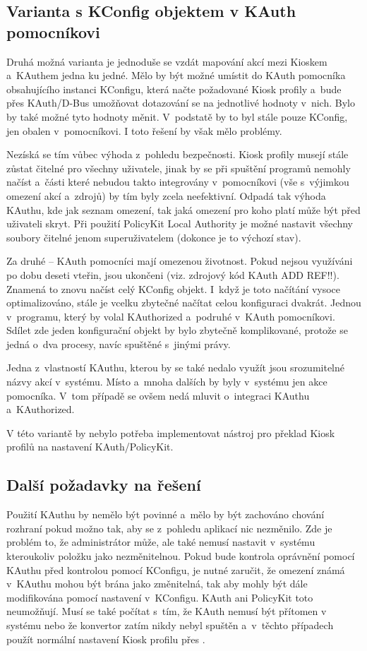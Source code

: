\subsection*{Varianta s KConfig objektem v KAuth pomocníkovi}
Druhá možná varianta je jednoduše se vzdát mapování akcí mezi Kioskem a~KAuthem jedna ku jedné. Mělo by být možné umístit do KAuth pomocníka obsahujícího instanci KConfigu, která načte požadované Kiosk profily a~bude přes KAuth/D-Bus umožňovat dotazování se na jednotlivé hodnoty v~nich. Bylo by také možné tyto hodnoty měnit. V~podstatě by to byl stále pouze KConfig, jen obalen v~pomocníkovi. I toto řešení by však mělo problémy.

Nezíská se tím vůbec výhoda z~pohledu bezpečnosti. Kiosk profily musejí stále zůstat čitelné pro všechny uživatele, jinak by se při spuštění programů nemohly načíst a~části které nebudou takto integrovány v~pomocníkovi (vše s~výjimkou omezení akcí a~zdrojů) by tím byly zcela neefektivní. Odpadá tak výhoda KAuthu, kde jak seznam omezení, tak jaká omezení pro koho platí může být před uživateli skryt. Při použití PolicyKit Local Authority je možné nastavit všechny soubory čitelné jenom superuživatelem (dokonce je to výchozí stav).

Za druhé -- KAuth pomocníci mají omezenou životnost. Pokud nejsou využíváni po dobu deseti vteřin, jsou ukončeni (viz. zdrojový kód KAuth ADD REF!!). Znamená to znovu načíst celý KConfig objekt. I~když je toto načítání vysoce optimalizováno, stále je vcelku zbytečné načítat celou konfiguraci dvakrát. Jednou v~programu, který by volal KAuthorized a~podruhé v~KAuth pomocníkovi. Sdílet zde jeden konfigurační objekt by bylo zbytečně komplikované, protože se jedná o~dva procesy, navíc spuštěné s~jinými právy.

Jedna z~vlastností KAuthu, kterou by se také nedalo využít jsou srozumitelné názvy akcí v~systému. Místo  a~mnoha dalších by byly v~systému jen akce pomocníka. V~tom případě se ovšem nedá mluvit o~integraci KAuthu a~KAuthorized.

V této variantě by nebylo potřeba implementovat nástroj pro překlad Kiosk profilů na nastavení KAuth/PolicyKit.

\subsection*{Další požadavky na řešení}
Použití KAuthu by nemělo být povinné a~mělo by být zachováno chování rozhraní  pokud možno tak, aby se z~pohledu aplikací nic nezměnilo. Zde je problém to, že administrátor může, ale také nemusí nastavit v~systému  kteroukoliv položku jako nezměnitelnou. Pokud bude kontrola oprávnění pomocí KAuthu před kontrolou pomocí KConfigu, je nutné zaručit, že omezení známá v~KAuthu mohou být brána jako změnitelná, tak aby mohly být dále modifikována pomocí nastavení v~KConfigu. KAuth ani PolicyKit toto neumožňují. Musí se také počítat s~tím, že KAuth nemusí být přítomen v systému nebo že konvertor zatím nikdy nebyl spuštěn a~v~těchto případech použít normální nastavení Kiosk profilu přes .

